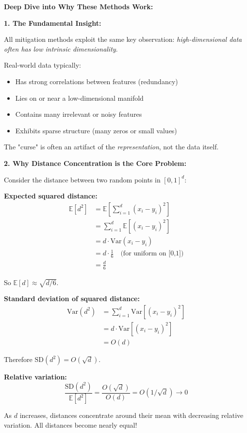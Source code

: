 \documentclass[12pt]{article}
\begin{document}
\begin{explanation}
\textbf{Deep Dive into Why These Methods Work:}

\textbf{1. The Fundamental Insight:}

All mitigation methods exploit the same key observation: \textit{high-dimensional data often has low intrinsic dimensionality}.

Real-world data typically:
\begin{itemize}
    \item Has strong correlations between features (redundancy)
    \item Lies on or near a low-dimensional manifold
    \item Contains many irrelevant or noisy features
    \item Exhibits sparse structure (many zeros or small values)
\end{itemize}

The "curse" is often an artifact of the \textit{representation}, not the data itself.

\textbf{2. Why Distance Concentration is the Core Problem:}

Consider the distance between two random points in \([0,1]^d\):

\textbf{Expected squared distance:}
\begin{align*}
\mathbb{E}[d^2] &= \mathbb{E}\left[\sum_{i=1}^d (x_i - y_i)^2\right] \\
&= \sum_{i=1}^d \mathbb{E}[(x_i - y_i)^2] \\
&= d \cdot \text{Var}(x_i - y_i) \\
&= d \cdot \frac{1}{6} \quad \text{(for uniform on [0,1])} \\
&= \frac{d}{6}
\end{align*}

So \(\mathbb{E}[d] \approx \sqrt{d/6}\).

\textbf{Standard deviation of squared distance:}
\begin{align*}
\text{Var}(d^2) &= \sum_{i=1}^d \text{Var}[(x_i - y_i)^2] \\
&= d \cdot \text{Var}[(x_i - y_i)^2] \\
&= O(d)
\end{align*}

Therefore \(\text{SD}(d^2) = O(\sqrt{d})\).

\textbf{Relative variation:}
\[
\frac{\text{SD}(d^2)}{\mathbb{E}[d^2]} = \frac{O(\sqrt{d})}{O(d)} = O(1/\sqrt{d}) \to 0
\]

As \(d\) increases, distances concentrate around their mean with decreasing relative variation. All distances become nearly equal!


\end{explanation}
\end{document}
